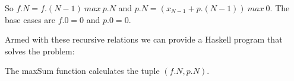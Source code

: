 So $f.N = f.(N - 1)\ max\ p.N$ and $p.N = (x_{N - 1} + p.(N - 1))\ max\ 0$. The base cases are $f.0 = 0$ and $p.0 = 0$.

Armed with these recursive relations we can provide a Haskell program that solves the problem:



The maxSum function calculates the tuple $(f.N, p.N)$.
